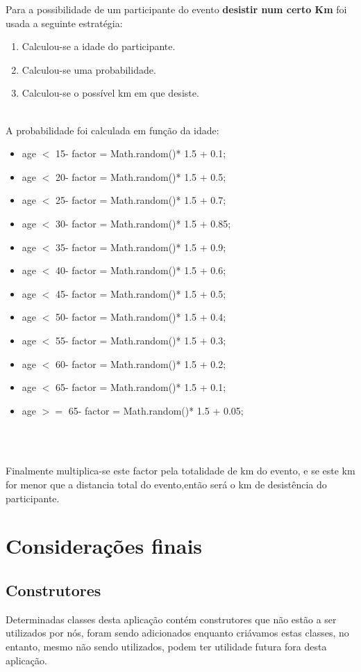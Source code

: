 \documentclass[12pt,notitlepage]{article}
\begin{document}
Para a possibilidade de um participante do evento  \textbf{desistir num certo Km} foi usada a seguinte estratégia:
\begin{enumerate}
\item Calculou-se a idade do participante.
\item Calculou-se uma probabilidade.
\item Calculou-se o possível km em que desiste.
\end{enumerate}~\\
A probabilidade foi calculada em função da idade:
\begin{itemize}
\item age $<$ 15- factor = Math.random()* 1.5 + 0.1;
\item age $<$ 20- factor = Math.random()* 1.5 + 0.5;
\item age $<$ 25- factor = Math.random()* 1.5 + 0.7;
\item age $<$ 30- factor = Math.random()* 1.5 + 0.85;
\item age $<$ 35- factor = Math.random()* 1.5 + 0.9;
\item age $<$ 40- factor = Math.random()* 1.5 + 0.6;
\item age $<$ 45- factor = Math.random()* 1.5 + 0.5;
\item age $<$ 50- factor = Math.random()* 1.5 + 0.4;
\item age $<$ 55- factor = Math.random()* 1.5 + 0.3;
\item age $<$ 60- factor = Math.random()* 1.5 + 0.2;
\item age $<$ 65- factor = Math.random()* 1.5 + 0.1;
\item age $>=$ 65- factor = Math.random()* 1.5 + 0.05;
\end{itemize}~\\~

Finalmente multiplica-se este factor pela totalidade de km do evento, e se este km for menor que a distancia total do evento,então será o km de desistência do participante.

\section{Considerações finais}

\subsection{Construtores}
Determinadas classes desta aplicação contém construtores que não estão a ser utilizados por nós, foram sendo adicionados enquanto criávamos estas classes, no entanto, mesmo não sendo utilizados, podem ter utilidade futura fora desta aplicação.
\end{document}
